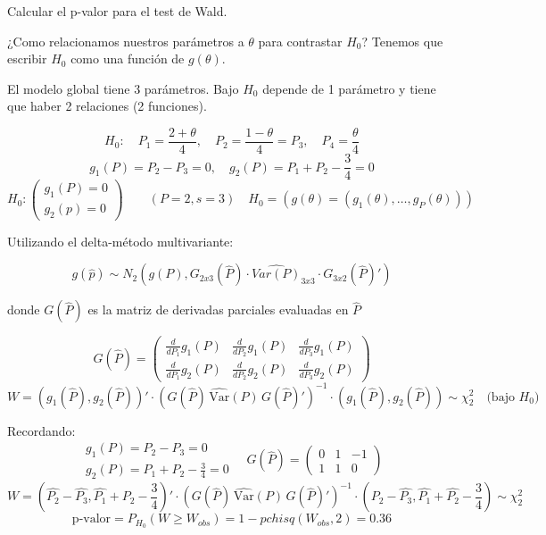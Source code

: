 Calcular el p-valor para el test de Wald.

¿Como relacionamos nuestros parámetros a $\theta$ para contrastar $H_0$? Tenemos que escribir $H_0$ como una función de $g(\theta)$.

El modelo global tiene 3 parámetros. Bajo $H_0$ depende de 1 parámetro y tiene que haber 2 relaciones (2 funciones).

\[
H_0: \quad P_1=\frac{2+\theta}{4}, \quad P_2=\frac{1-\theta}{4}=P_3, \quad P_4=\frac{\theta}{4}
\]\[g_1(P)=P_2-P_3=0, \quad g_2(P)=P_1+P_2-\frac{3}{4}=0
\]\[H_0:
\begin{pmatrix}
    g_1(P)=0 \\
    g_2(p)=0
\end{pmatrix} \qquad (P=2,s=3) \quad H_0=(g(\theta)=(g_1(\theta),\dots,g_P(\theta)))
\]

Utilizando el delta-método multivariante:

\[
g(\widehat{p})\sim N_2(g(P),G_{2x3}(\widehat{P})\cdot \widehat{Var(P)}_{3x3} \cdot G_{3x2}(\widehat{P})')
\]

donde $G(\widehat{P})$ es la matriz de derivadas parciales evaluadas en $\widehat{P}$

\[
G(\widehat{P})=
\begin{pmatrix}
    \frac{d}{d P_1} g_1(P) & \frac{d}{d P_2} g_1(P) & \frac{d}{d P_3} g_1(P) \\
    \frac{d}{d P_1} g_2(P) & \frac{d}{d P_2} g_2(P) & \frac{d}{d P_3} g_2(P) 
\end{pmatrix}
\]
\[
W = \left( g_1(\widehat{P}), g_2(\widehat{P}) \right)' \cdot \left( G(\widehat{P}) \, \widehat{\text{Var}}(P) \, G(\widehat{P})' \right)^{-1} \cdot \left( g_1(\widehat{P}), g_2(\widehat{P}) \right) \sim \chi^2_2 \quad \text{(bajo } H_0\text{)}
\]

Recordando:   
\[
\begin{matrix}
    g_1(P)=P_2-P_3=0 \\
    g_2(P)=P_1+P_2-\frac{3}{4}=0
\end{matrix}
\quad
G(\widehat{P})=
\begin{pmatrix}
    0 & 1 & -1\\
    1 & 1 & 0
\end{pmatrix}
\]
\[
W = \left( \widehat{P_2}-\widehat{P_3}, \widehat{P_1}+\widehat{P_2}-\frac{3}{4} \right)' \cdot \left( G(\widehat{P}) \, \widehat{\text{Var}}(P) \, G(\widehat{P})' \right)^{-1} \cdot 
\left(  \widehat{P_2}-\widehat{P_3}, \widehat{P_1}+\widehat{P_2}-\frac{3}{4} \right) \sim \chi^2_2 
\]
\[
\text{p-valor}=P_{H_0}(W \geq W_{obs})=1-pchisq(W_{obs},2)=0.36
\]

